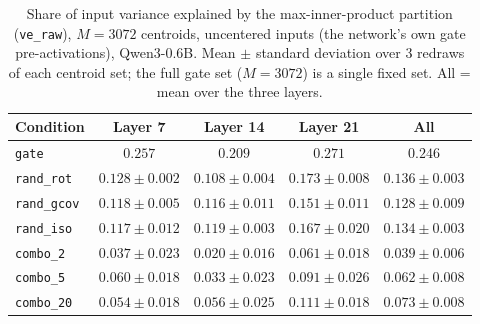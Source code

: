 \begin{table}[t]
\centering
\begin{tabular}{lcccc}
\toprule
Condition & Layer 7 & Layer 14 & Layer 21 & All \\
\midrule
\texttt{gate} & $0.257$ & $0.209$ & $0.271$ & $0.246$ \\
\addlinespace
\texttt{rand\_rot} & $0.128 \pm 0.002$ & $0.108 \pm 0.004$ & $0.173 \pm 0.008$ & $0.136 \pm 0.003$ \\
\texttt{rand\_gcov} & $0.118 \pm 0.005$ & $0.116 \pm 0.011$ & $0.151 \pm 0.011$ & $0.128 \pm 0.009$ \\
\texttt{rand\_iso} & $0.117 \pm 0.012$ & $0.119 \pm 0.003$ & $0.167 \pm 0.020$ & $0.134 \pm 0.003$ \\
\addlinespace
\texttt{combo\_2} & $0.037 \pm 0.023$ & $0.020 \pm 0.016$ & $0.061 \pm 0.018$ & $0.039 \pm 0.006$ \\
\texttt{combo\_5} & $0.060 \pm 0.018$ & $0.033 \pm 0.023$ & $0.091 \pm 0.026$ & $0.062 \pm 0.008$ \\
\texttt{combo\_20} & $0.054 \pm 0.018$ & $0.056 \pm 0.025$ & $0.111 \pm 0.018$ & $0.073 \pm 0.008$ \\
\bottomrule
\end{tabular}
\caption{Share of input variance explained by the max-inner-product partition (\texttt{ve\_raw}), $M = 3072$ centroids, uncentered inputs (the network's own gate pre-activations), Qwen3-0.6B. Mean $\pm$ standard deviation over 3 redraws of each centroid set; the full gate set ($M = 3072$) is a single fixed set. All = mean over the three layers.}
\label{tab:ve-raw-ip-raw-M3072}
\end{table}

